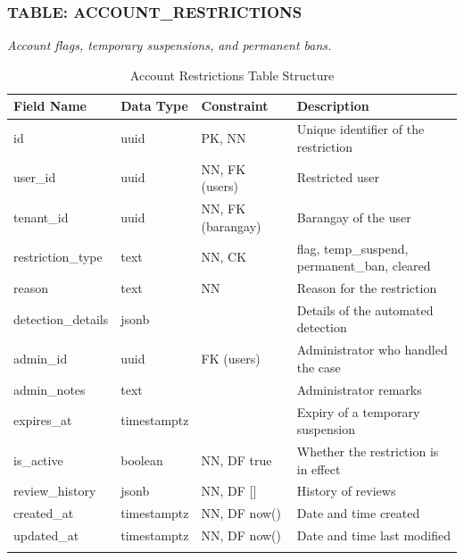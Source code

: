 \subsubsection*{TABLE: ACCOUNT\_RESTRICTIONS}
\noindent\textit{Account flags, temporary suspensions, and permanent bans.}
\begin{longtable}{|p{3.2cm}|p{2.2cm}|p{3.2cm}|p{5.4cm}|}
\hline
\textbf{Field Name} & \textbf{Data Type} & \textbf{Constraint} & \textbf{Description} \\ \hline
\endhead
\hline \endfoot
\hline \endlastfoot
id & uuid & PK, NN & Unique identifier of the restriction \\ \hline
user\_id & uuid & NN, FK (users) & Restricted user \\ \hline
tenant\_id & uuid & NN, FK (barangay) & Barangay of the user \\ \hline
restriction\_type & text & NN, CK & flag, temp\_suspend, permanent\_ban, cleared \\ \hline
reason & text & NN & Reason for the restriction \\ \hline
detection\_details & jsonb & & Details of the automated detection \\ \hline
admin\_id & uuid & FK (users) & Administrator who handled the case \\ \hline
admin\_notes & text & & Administrator remarks \\ \hline
expires\_at & timestamptz & & Expiry of a temporary suspension \\ \hline
is\_active & boolean & NN, DF true & Whether the restriction is in effect \\ \hline
review\_history & jsonb & NN, DF [] & History of reviews \\ \hline
created\_at & timestamptz & NN, DF now() & Date and time created \\ \hline
updated\_at & timestamptz & NN, DF now() & Date and time last modified \\ \hline
\caption{Account Restrictions Table Structure}
\label{tab:account_restrictions}
\end{longtable}
\vspace{3mm}

